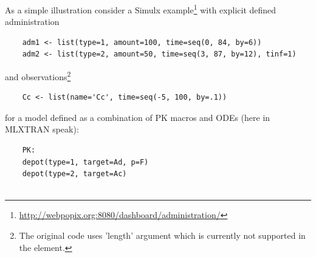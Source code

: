 \begin{example}
As a simple illustration consider a Simulx example\footnote{\url{http://webpopix.org:8080/dashboard/administration/}} 
with explicit defined administration 
\lstset{language=MLX}
\begin{lstlisting}
	adm1 <- list(type=1, amount=100, time=seq(0, 84, by=6))
	adm2 <- list(type=2, amount=50, time=seq(3, 87, by=12), tinf=1)
\end{lstlisting}
\lstset{language=MLX}
and observations\footnote{The original code uses 'length' argument which is currently not 
supported in the  element.}
\begin{lstlisting}
	Cc <- list(name='Cc', time=seq(-5, 100, by=.1))
\end{lstlisting}
for a model defined as a combination of PK macros and ODEs (here in MLXTRAN speak):
\lstset{language=MLX}
\begin{lstlisting}
	PK:
	depot(type=1, target=Ad, p=F)
	depot(type=2, target=Ac)


\end{lstlisting}
\end{example}
